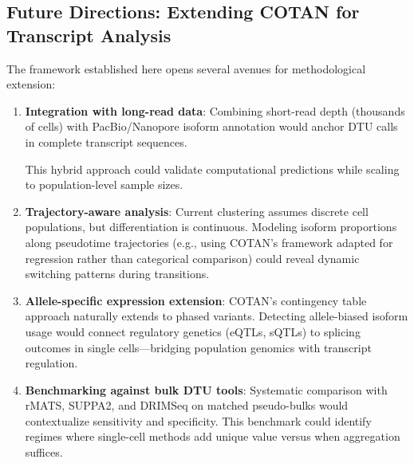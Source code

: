 \subsection*{Future Directions: Extending COTAN for Transcript Analysis}

The framework established here opens several avenues for methodological extension:
\begin{enumerate}
    \item \textbf{Integration with long-read data}: Combining short-read depth (thousands of cells) with PacBio/Nanopore isoform annotation would anchor DTU calls in complete transcript sequences.

This hybrid approach could validate computational predictions while scaling to population-level sample sizes.

    \item \textbf{Trajectory-aware analysis}: Current clustering assumes discrete cell populations, but differentiation is continuous. Modeling isoform proportions along pseudotime trajectories (e.g., using COTAN's framework adapted for regression rather than categorical comparison) could reveal dynamic switching patterns during transitions.

    \item \textbf{Allele-specific expression extension}: COTAN's contingency table approach naturally extends to phased variants. Detecting allele-biased isoform usage would connect regulatory genetics (eQTLs, sQTLs) to splicing outcomes in single cells---bridging population genomics with transcript regulation.

    \item \textbf{Benchmarking against bulk DTU tools}: Systematic comparison with rMATS, SUPPA2, and DRIMSeq \cite{love2018swimming, draper2025selecting} on matched pseudo-bulks would contextualize sensitivity and specificity. This benchmark could identify regimes where single-cell methods add unique value versus when aggregation suffices.
\end{enumerate}

